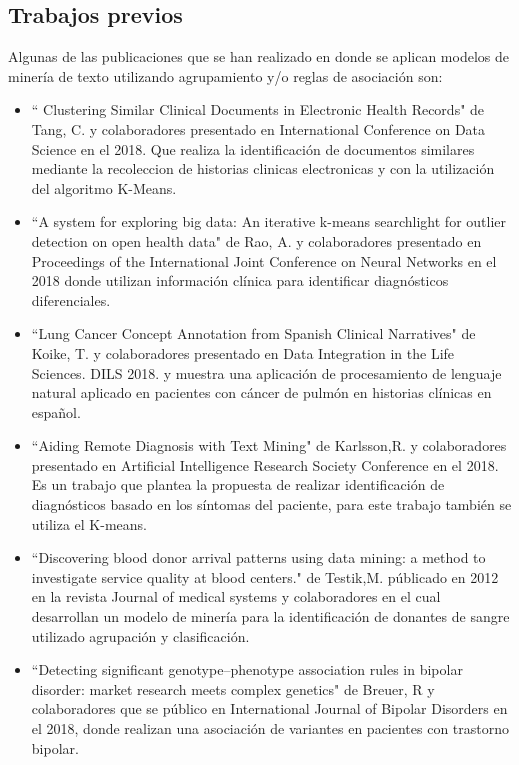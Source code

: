 {\subsection*{Trabajos previos}

Algunas de las publicaciones que se han realizado en donde se aplican modelos de minería de texto utilizando agrupamiento y/o reglas de asociación son:

\begin{itemize}
	\item ``
	Clustering Similar Clinical Documents in Electronic Health Records" de Tang, C. y colaboradores presentado en International Conference on Data Science en el 2018. Que realiza la identificación de documentos similares mediante la recoleccion de historias clinicas electronicas y con la utilización del algoritmo K-Means. 
	
	\item ``A system for exploring big data: An iterative k-means searchlight for outlier detection on open health data" de Rao, A. y colaboradores presentado en Proceedings of the International Joint Conference on Neural Networks en el 2018 donde utilizan información clínica para identificar diagnósticos diferenciales.  
	
	\item ``Lung Cancer Concept Annotation from Spanish Clinical Narratives" de Koike, T. y colaboradores presentado en  Data Integration in the Life Sciences. DILS 2018. y muestra una aplicación de procesamiento de lenguaje natural aplicado en pacientes con cáncer de pulmón en historias clínicas en español.
	
	\item ``Aiding Remote Diagnosis with Text Mining" de Karlsson,R. y colaboradores presentado en Artificial Intelligence Research Society Conference en el 2018. Es un trabajo que plantea la propuesta de realizar identificación de diagnósticos basado en los síntomas del paciente, para este trabajo también se utiliza el K-means.
	
	\item ``Discovering blood donor arrival patterns using data mining: a method to investigate service quality at blood centers."  de Testik,M. públicado en 2012 en la revista  Journal of medical systems y colaboradores en el cual desarrollan un modelo de minería para la identificación de donantes de sangre utilizado agrupación y clasificación.
	
	\item ``Detecting significant genotype–phenotype association rules in bipolar disorder: market research meets complex genetics" de Breuer, R y colaboradores que se público  en International Journal of Bipolar Disorders en el 2018, donde realizan una asociación de variantes en pacientes con trastorno bipolar.


\end{itemize}}
